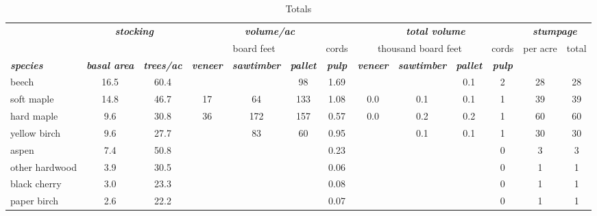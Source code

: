 \documentclass[landscape]{article}
\begin{document}
\begin{table}[H]

\caption{\label{tab:unnamed-chunk-44}Totals}
\fontsize{10}{12}\selectfont
\begin{tabular}[t]{lcccccccccccc}
\toprule
\multicolumn{1}{c}{\em{\textbf{ }}} & \multicolumn{2}{c}{\em{\textbf{stocking}}} & \multicolumn{4}{c}{\em{\textbf{volume/ac }}} & \multicolumn{4}{c}{\em{\textbf{total volume}}} & \multicolumn{2}{c}{\em{\textbf{stumpage}}} \\
\cmidrule(l{3pt}r{3pt}){2-3} \cmidrule(l{3pt}r{3pt}){4-7} \cmidrule(l{3pt}r{3pt}){8-11} \cmidrule(l{3pt}r{3pt}){12-13}
\multicolumn{3}{c}{ } & \multicolumn{3}{c}{board feet} & \multicolumn{1}{c}{cords} & \multicolumn{3}{c}{thousand board feet} & \multicolumn{1}{c}{cords} & \multicolumn{1}{c}{per acre} & \multicolumn{1}{c}{total} \\
\cmidrule(l{3pt}r{3pt}){4-6} \cmidrule(l{3pt}r{3pt}){7-7} \cmidrule(l{3pt}r{3pt}){8-10} \cmidrule(l{3pt}r{3pt}){11-11} \cmidrule(l{3pt}r{3pt}){12-12} \cmidrule(l{3pt}r{3pt}){13-13}
\rowcolor[HTML]{DCDCDC}  \em{\textbf{species}} & \em{\textbf{basal area}} & \em{\textbf{trees/ac}} & \em{\textbf{veneer}} & \em{\textbf{sawtimber}} & \em{\textbf{pallet}} & \em{\textbf{pulp}} & \em{\textbf{veneer}} & \em{\textbf{sawtimber}} & \em{\textbf{pallet}} & \em{\textbf{pulp}} & \em{\textbf{ }} & \em{\textbf{ }}\\
\midrule
\rowcolor{gray!6}  beech & 16.5 & 60.4 &  &  & 98 & 1.69 &  &  & 0.1 & 2 & 28 & 28\\
 
soft maple & 14.8 & 46.7 & 17 & 64 & 133 & 1.08 & 0.0 & 0.1 & 0.1 & 1 & 39 & 39\\
 
\rowcolor{gray!6}  hard maple & 9.6 & 30.8 & 36 & 172 & 157 & 0.57 & 0.0 & 0.2 & 0.2 & 1 & 60 & 60\\
 
yellow birch & 9.6 & 27.7 &  & 83 & 60 & 0.95 &  & 0.1 & 0.1 & 1 & 30 & 30\\
 
\rowcolor{gray!6}  aspen & 7.4 & 50.8 &  &  &  & 0.23 &  &  &  & 0 & 3 & 3\\
 
other hardwood & 3.9 & 30.5 &  &  &  & 0.06 &  &  &  & 0 & 1 & 1\\
 
\rowcolor{gray!6}  black cherry & 3.0 & 23.3 &  &  &  & 0.08 &  &  &  & 0 & 1 & 1\\
 
paper birch & 2.6 & 22.2 &  &  &  & 0.07 &  &  &  & 0 & 1 & 1\\
 

\end{tabular}
\end{table}
\end{document}
